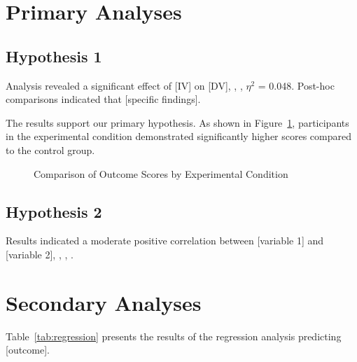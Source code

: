 \documentclass[11pt,letterpaper]{report}
\begin{document}
\section{Primary Analyses}

\subsection{Hypothesis 1}

\begin{resultsbox}
Analysis revealed a significant effect of [IV] on [DV], , , $\eta^2$ = 0.048. Post-hoc comparisons indicated that [specific findings].
\end{resultsbox}

The results support our primary hypothesis. As shown in Figure~\ref{fig:main_results}, participants in the experimental condition demonstrated significantly higher scores compared to the control group.

\begin{figure}[htbp]
\centering
{}
\caption{Comparison of Outcome Scores by Experimental Condition}
\label{fig:main_results}
\end{figure}

\subsection{Hypothesis 2}

Results indicated a moderate positive correlation between [variable 1] and [variable 2], , , .

\section{Secondary Analyses}

Table~\ref{tab:regression} presents the results of the regression analysis predicting [outcome].
\end{document}
